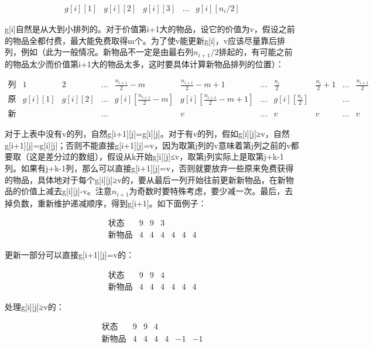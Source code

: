 \documentclass[UTF8]{ctexart}
\theoremstyle{nonumberplain}
\begin{document}
			$$ \begin{array}{ccccc} g[i][1] & g[i][2] & g[i][3] & ... & g[i][n_i/2] \end{array} $$
			
			g[i]自然是从大到小排列的。对于价值第i+1大的物品，设它的价值为v，假设之前的物品全都付费，最大能免费取得m个。为了使v能更新g[i]，v应该尽量靠后排列，例如（此为一般情况。新物品不一定是由最右列$n_{i+1}/2$排起的，有可能之前的物品太少而价值第i+1大的物品太多，这时要具体计算新物品排列的位置）：
			
			$$ \begin{array}{lcccccccccc}
				\mbox{列编号} & 1 & 2 & ... & \frac{n_{i+1}}{2}-m & \frac{n_{i+1}}{2}-m+1 & ... & \frac{n_i}{2} & \frac{n_i}{2}+1 & ... & \frac{n_{i+1}}{2} \\
				\mbox{原状态} & g[i][1] & g[i][2] & ... & g[i][\frac{n_{i+1}}{2}-m] & g[i][\frac{n_{i+1}}{2}-m+1] & ... & g[i][\frac{n_i}{2}] & & ... & \\
				\mbox{新物品} & & & ... & & v & ... & v & v & ... & v
			\end{array} $$
			
			对于上表中没有v的列，自然g[i+1][j]=g[i][j]。对于有v的列，假如g[i][j]≥v，自然g[i+1][j]=g[i][j]；否则不能直接g[i+1][j]=v，因为取第j列的v意味着第j列之前的v都要取（这是差分过的数组），假设从k开始g[i][j]≤v，取第j列实际上是取第j+k-1列。如果有j+k-1列，那么可以直接g[i+1][j]=v，否则就要放弃一些原来免费获得的物品，具体地对于每个g[i][j]≥v的，要从最后一列开始往前更新新物品，在新物品的价值上减去g[i][j]-v。注意$n_{i+1}$为奇数时要特殊考虑，要少减一次。最后，去掉负数，重新维护递减顺序，得到g[i+1]。如下面例子：
			
			$$\begin{array}{lcccccc}
				\mbox{状态} & 9 & 9 & 3 &  &  &  \\
				\mbox{新物品} & 4 & 4 & 4 & 4 & 4 & 4
			\end{array}$$
			
			更新一部分可以直接g[i+1][j]=v的：
			
			$$\begin{array}{lcccccc}
				\mbox{状态} & 9 & 9 & 4 &  &  &  \\
				\mbox{新物品} & 4 & 4 & 4 & 4 & 4 & 4
			\end{array}$$
			
			处理g[i][j]≥v的：
			
			$$\begin{array}{lcccccc}
				\mbox{状态} & 9 & 9 & 4 &  &  &  \\
				\mbox{新物品} & 4 & 4 & 4 & 4 & -1 & -1
			\end{array}$$
			
\end{document}
